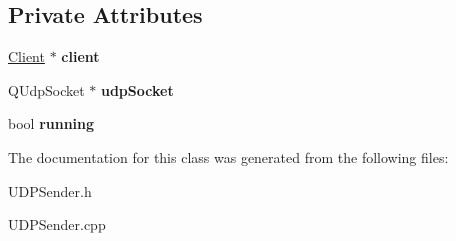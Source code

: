 \subsection*{Private Attributes}
\begin{DoxyCompactItemize}
\item 
\hypertarget{classUDPSender_a095b19ae7dddaf46b464d964e4233c37}{
\hyperlink{classClient}{Client} $\ast$ {\bfseries client}}
\label{classUDPSender_a095b19ae7dddaf46b464d964e4233c37}

\item 
\hypertarget{classUDPSender_a04b0beb20e2da8d2a722d1796c1fb5e8}{
QUdpSocket $\ast$ {\bfseries udpSocket}}
\label{classUDPSender_a04b0beb20e2da8d2a722d1796c1fb5e8}

\item 
\hypertarget{classUDPSender_a73988ecd7f31e40409d0c10f914052ad}{
bool {\bfseries running}}
\label{classUDPSender_a73988ecd7f31e40409d0c10f914052ad}

\end{DoxyCompactItemize}


The documentation for this class was generated from the following files:\begin{DoxyCompactItemize}
\item 
UDPSender.h\item 
UDPSender.cpp\end{DoxyCompactItemize}
